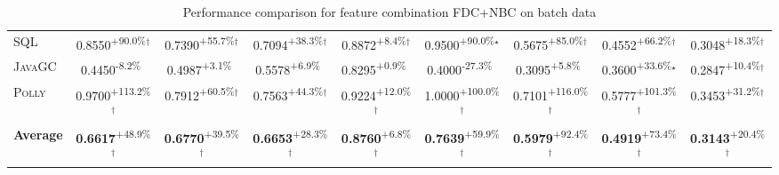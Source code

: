 \begin{table}[htbp]
\begin{tabular}{l|cccc|cccc}
\textsc{SQL} & \cellcolor{green!30}0.8550\textsuperscript{+90.0\%}$^\dagger$ & \cellcolor{green!30}0.7390\textsuperscript{+55.7\%}$^\dagger$ & \cellcolor{green!30}0.7094\textsuperscript{+38.3\%}$^\dagger$ & \cellcolor{green!30}0.8872\textsuperscript{+8.4\%}$^\dagger$ & \cellcolor{green!30}0.9500\textsuperscript{+90.0\%}$^\star$ & \cellcolor{green!30}0.5675\textsuperscript{+85.0\%}$^\dagger$ & \cellcolor{green!30}0.4552\textsuperscript{+66.2\%}$^\dagger$ & \cellcolor{green!30}0.3048\textsuperscript{+18.3\%}$^\dagger$ \\
\textsc{JavaGC} & \cellcolor{red!30}0.4450\textsuperscript{-8.2\%}$^{\,\,\,}$ & \cellcolor{green!30}0.4987\textsuperscript{+3.1\%}$^{\,\,\,}$ & \cellcolor{green!30}0.5578\textsuperscript{+6.9\%}$^{\,\,\,}$ & \cellcolor{green!30}0.8295\textsuperscript{+0.9\%}$^{\,\,\,}$ & \cellcolor{red!30}0.4000\textsuperscript{-27.3\%}$^{\,\,\,}$ & \cellcolor{green!30}0.3095\textsuperscript{+5.8\%}$^{\,\,\,}$ & \cellcolor{green!30}0.3600\textsuperscript{+33.6\%}$^\star$ & \cellcolor{green!30}0.2847\textsuperscript{+10.4\%}$^\dagger$ \\
\textsc{Polly} & \cellcolor{green!30}0.9700\textsuperscript{+113.2\%}$^\dagger$ & \cellcolor{green!30}0.7912\textsuperscript{+60.5\%}$^\dagger$ & \cellcolor{green!30}0.7563\textsuperscript{+44.3\%}$^\dagger$ & \cellcolor{green!30}0.9224\textsuperscript{+12.0\%}$^\dagger$ & \cellcolor{green!30}1.0000\textsuperscript{+100.0\%}$^\dagger$ & \cellcolor{green!30}0.7101\textsuperscript{+116.0\%}$^\dagger$ & \cellcolor{green!30}0.5777\textsuperscript{+101.3\%}$^\dagger$ & \cellcolor{green!30}0.3453\textsuperscript{+31.2\%}$^\dagger$ \\
\hline
\textbf{Average} & \cellcolor{green!30}\textbf{0.6617}\textsuperscript{+48.9\%}$^\dagger$ & \cellcolor{green!30}\textbf{0.6770}\textsuperscript{+39.5\%}$^\dagger$ & \cellcolor{green!30}\textbf{0.6653}\textsuperscript{+28.3\%}$^\dagger$ & \cellcolor{green!30}\textbf{0.8760}\textsuperscript{+6.8\%}$^\dagger$ & \cellcolor{green!30}\textbf{0.7639}\textsuperscript{+59.9\%}$^\dagger$ & \cellcolor{green!30}\textbf{0.5979}\textsuperscript{+92.4\%}$^\dagger$ & \cellcolor{green!30}\textbf{0.4919}\textsuperscript{+73.4\%}$^\dagger$ & \cellcolor{green!30}\textbf{0.3143}\textsuperscript{+20.4\%}$^\dagger$ \\
\hline
\end{tabular}
\caption{Performance comparison for feature combination FDC+NBC on batch data}
\label{tab:combo_FDC_NBC_performance_batch}
\end{table}